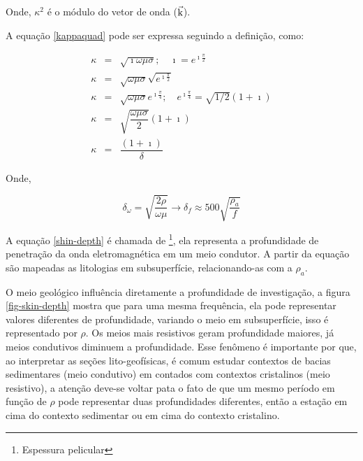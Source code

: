         \noindent Onde, $\kappa^2$ é o módulo do vetor de onda ($\vec{\textrm{k}}$).
        
        A equação \ref{kappaquad} pode ser expressa seguindo a definição, como:
        
        {\setlength\arraycolsep{2pt}
        \begin{eqnarray}
            \kappa & = & \sqrt{\imath \omega \mu \sigma}; \quad \imath = e^{\imath \frac{\pi}{2}} \nonumber \\
            \kappa & = & \sqrt{\omega \mu \sigma} \sqrt{e^{\imath \frac{\pi}{2}}} \nonumber \\
            \kappa & = & \sqrt{\omega \mu \sigma} e^{\imath \frac{\pi}{4}}; \quad e^{\imath \frac{\pi}{4}} = \sqrt{1/2} (1 + \imath) \nonumber \\
            \kappa & = & \sqrt{\dfrac{\omega \mu \sigma}{2}} (1 + \imath) \nonumber \\
            \kappa & = & \dfrac{(1 + \imath)}{\delta}
        \end{eqnarray}} 
        
        \noindent Onde,
        
        \begin{equation}
            \label{shin-depth}
            \delta_\omega = \sqrt{\dfrac{2 \rho}{\omega \mu}} \longrightarrow \delta_f \approx 500  \sqrt{\frac{\rho_a}{f}}
        \end{equation}
        
        A equação \ref{shin-depth} é chamada de \footnote{Espessura pelicular}, ela representa a profundidade de penetração da onda eletromagnética em um meio condutor.
        A partir da equação são mapeadas as litologias em subsuperfície, relacionando-as com a $\rho_a$.        

        O meio geológico influência diretamente a profundidade de investigação, a figura \ref{fig-skin-depth} mostra que para uma mesma frequência, ela pode representar valores diferentes de profundidade, variando o meio em subsuperfície, isso é representado por $\rho$. Os meios mais resistivos geram profundidade maiores, já meios condutivos diminuem a profundidade. Esse fenômeno é importante por que, ao interpretar as seções lito-geofísicas, é comum estudar contextos de bacias sedimentares (meio condutivo) em contados com contextos cristalinos (meio resistivo), a atenção deve-se voltar pata o fato de que um mesmo período em função de $\rho$ pode representar duas profundidades diferentes, então a estação em cima do contexto sedimentar ou em cima do contexto cristalino. 
        
